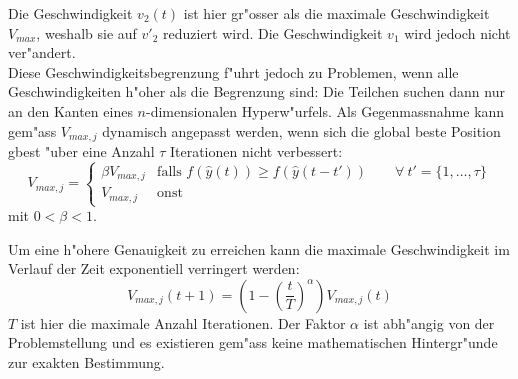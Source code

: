 Die Geschwindigkeit $v_2(t)$ ist hier gr"osser als die maximale
Geschwindigkeit $V_{max}$, weshalb sie auf $v'_2$ reduziert wird. Die
Geschwindigkeit $v_1$ wird jedoch nicht ver"andert. \\

Diese Geschwindigkeitsbegrenzung f"uhrt jedoch zu Problemen, wenn alle
Geschwindigkeiten h"oher als die Begrenzung sind: Die Teilchen suchen
dann nur an den Kanten eines $n$-dimensionalen Hyperw"urfels. Als
Gegenmassnahme kann gem"ass \cite{schutte-sizing} $V_{max,j}$ dynamisch
angepasst werden, wenn sich die global beste Position gbest "uber eine
Anzahl $\tau$ Iterationen nicht verbessert:
\begin{equation}
	V_{max,j} = 
	\begin{cases}
		\beta V_{max,j} & \text{falls $f(\hat{y}(t)) \geq f(\hat{y}(t-t')) 
			 \qquad  \forall \: t' = \{ 1, \dots, \tau \}$} \\
		V_{max,j} & \text{onst}
	\end{cases}
\end{equation}
mit $0 < \beta < 1$.

Um eine h"ohere Genauigkeit zu erreichen kann die maximale Geschwindigkeit
im Verlauf der Zeit exponentiell verringert werden:
\begin{equation}
	V_{max,j}(t+1) = \left(1-\left(\frac{t}{T}\right)^{\alpha}\right) V_{max,j}(t)
\end{equation}
$T$ ist hier die maximale Anzahl Iterationen. Der Faktor $\alpha$
ist abh"angig von der Problemstellung und es existieren gem"ass
\cite{Han-Modification} keine mathematischen Hintergr"unde zur exakten
Bestimmung.

